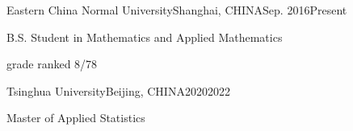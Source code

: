 
\begin{eduitem}{Eastern China Normal University}{Shanghai, CHINA}{Sep. 2016}{Present}
\item B.S. Student in Mathematics and Applied Mathematics
\item grade ranked 8/78
\end{eduitem}
\begin{eduitem}{Tsinghua University}{Beijing, CHINA}{2020}{2022}
    \item Master of Applied Statistics
\end{eduitem}



\endinput